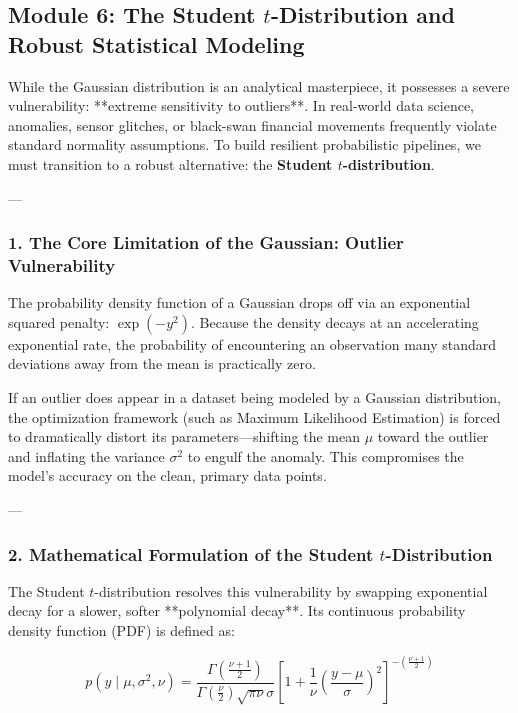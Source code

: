 \documentclass{article}
\begin{document}
\subsection*{Module 6: The Student $t$-Distribution and Robust Statistical Modeling}

While the Gaussian distribution is an analytical masterpiece, it possesses a severe vulnerability: **extreme sensitivity to outliers**. In real-world data science, anomalies, sensor glitches, or black-swan financial movements frequently violate standard normality assumptions. To build resilient probabilistic pipelines, we must transition to a robust alternative: the \textbf{Student $t$-distribution}.

---

\subsubsection*{1. The Core Limitation of the Gaussian: Outlier Vulnerability}
The probability density function of a Gaussian drops off via an exponential squared penalty: $\exp(-y^2)$. Because the density decays at an accelerating exponential rate, the probability of encountering an observation many standard deviations away from the mean is practically zero. 

If an outlier does appear in a dataset being modeled by a Gaussian distribution, the optimization framework (such as Maximum Likelihood Estimation) is forced to dramatically distort its parameters—shifting the mean $\mu$ toward the outlier and inflating the variance $\sigma^2$ to engulf the anomaly. This compromises the model's accuracy on the clean, primary data points.

---

\subsubsection*{2. Mathematical Formulation of the Student $t$-Distribution}
The Student $t$-distribution resolves this vulnerability by swapping exponential decay for a slower, softer **polynomial decay**. Its continuous probability density function (PDF) is defined as:

\begin{equation}
    p(y \mid \mu, \sigma^2, \nu) = \frac{\Gamma\left(\frac{\nu+1}{2}\right)}{\Gamma\left(\frac{\nu}{2}\right)\sqrt{\pi \nu} \sigma} \left[ 1 + \frac{1}{\nu}\left(\frac{y - \mu}{\sigma}\right)^2 \right]^{-\left(\frac{\nu+1}{2}\right)} \tag{2.130}
\end{equation}
\end{document}
